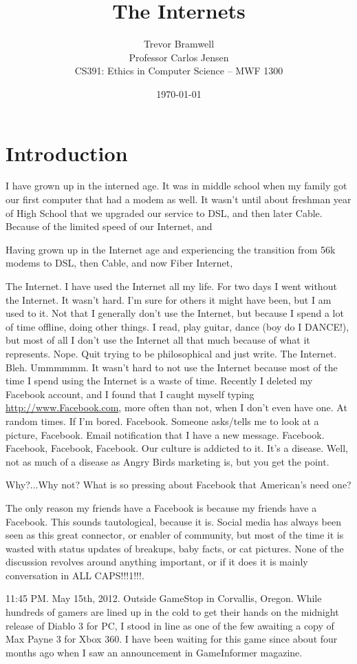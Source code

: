 \documentclass[12pt,letterpaper]{article}
\title{The Internets}
\author{
    Trevor Bramwell\\
    Professor Carlos Jensen\\
    CS391: Ethics in Computer Science -- MWF 1300\\
}
\date{\today}
\begin{document}
\maketitle

\section{Introduction}
I have grown up in the interned age. It was in  middle school when my
family got our first computer that had a modem as well. It wasn't until
about freshman year of High School that we upgraded our service to DSL,
and then later Cable. Because of the limited speed of our Internet, and 

Having grown up in the Internet age and experiencing the transition from
56k modems to DSL, then Cable, and now Fiber Internet,  

The Internet. I have used the Internet all my life. For two days I went
without the Internet. It wasn't hard. I'm sure for others it might have
been, but I am used to it. Not that I generally don't use the Internet,
but because I spend a lot of time offline, doing other things. I read,
play guitar, dance (boy do I DANCE!), but most of all I don't use the
Internet all that much because of what it represents. Nope. Quit trying
to be philosophical and just write. The Internet. Bleh. Ummmmmm. It
wasn't hard to not use the Internet because most of the time I spend
using the Internet is a waste of time. Recently I deleted my Facebook
account, and I found that I caught myself typing \url{http://www.Facebook.com}, more
often than not, when I don't even have one. At random times. If I'm
bored. Facebook. Someone asks/tells me to look at a picture, Facebook.
Email notification that I have a new message. Facebook. Facebook,
Facebook, Facebook. Our culture is addicted to it. It's a disease. Well,
not as much of a disease as Angry Birds marketing is, but you get the
point.

 Why?...Why not? What is so pressing about
Facebook that American's need one?

The only reason my friends have a Facebook is because my friends have a
Facebook. This sounds tautological, because it is. Social media has
always been seen as this great connector, or enabler of community, but
most of the time it is wasted  with status updates of breakups, baby
facts, or cat pictures. None of the discussion revolves around anything
important, or if it does it is mainly conversation in ALL
CAPS!!!1!!!.

11:45 PM. May 15th, 2012. Outside GameStop in Corvallis, Oregon. While hundreds of gamers are lined up
in the cold to get their hands on the midnight release of Diablo 3 for
PC, I stood in line as one of the few awaiting a copy of Max Payne 3 for
Xbox 360. I have been waiting for this game since about four months ago
when I saw an announcement in GameInformer magazine. 
\end{document}
